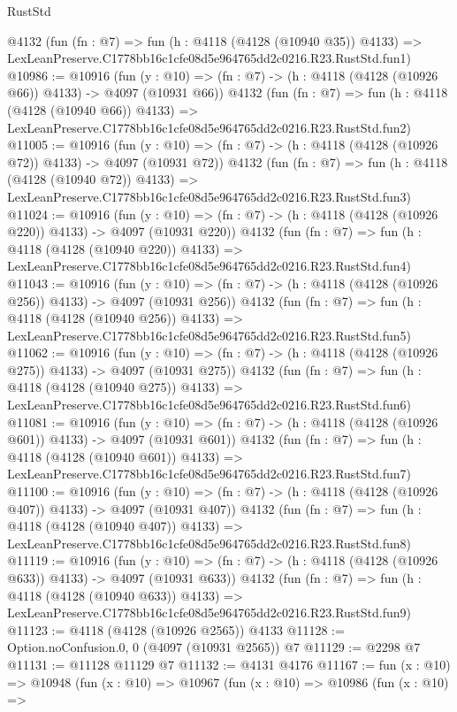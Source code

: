 \begin{lexlean}{RustStd}
\begin{coremodule}
    @4132
    (fun (fn : @7) =>
    fun (h : @4118 (@4128 (@10940 @35)) @4133) =>
    LexLeanPreserve.C1778bb16c1cfe08d5e964765dd2c0216.R23.RustStd.fun1)
@10986 := @10916
    (fun (y : @10) => (fn : @7) -> (h : @4118 (@4128 (@10926 @66)) @4133) -> @4097 (@10931 @66))
    @4132
    (fun (fn : @7) =>
    fun (h : @4118 (@4128 (@10940 @66)) @4133) =>
    LexLeanPreserve.C1778bb16c1cfe08d5e964765dd2c0216.R23.RustStd.fun2)
@11005 := @10916
    (fun (y : @10) => (fn : @7) -> (h : @4118 (@4128 (@10926 @72)) @4133) -> @4097 (@10931 @72))
    @4132
    (fun (fn : @7) =>
    fun (h : @4118 (@4128 (@10940 @72)) @4133) =>
    LexLeanPreserve.C1778bb16c1cfe08d5e964765dd2c0216.R23.RustStd.fun3)
@11024 := @10916
    (fun (y : @10) => (fn : @7) -> (h : @4118 (@4128 (@10926 @220)) @4133) -> @4097 (@10931 @220))
    @4132
    (fun (fn : @7) =>
    fun (h : @4118 (@4128 (@10940 @220)) @4133) =>
    LexLeanPreserve.C1778bb16c1cfe08d5e964765dd2c0216.R23.RustStd.fun4)
@11043 := @10916
    (fun (y : @10) => (fn : @7) -> (h : @4118 (@4128 (@10926 @256)) @4133) -> @4097 (@10931 @256))
    @4132
    (fun (fn : @7) =>
    fun (h : @4118 (@4128 (@10940 @256)) @4133) =>
    LexLeanPreserve.C1778bb16c1cfe08d5e964765dd2c0216.R23.RustStd.fun5)
@11062 := @10916
    (fun (y : @10) => (fn : @7) -> (h : @4118 (@4128 (@10926 @275)) @4133) -> @4097 (@10931 @275))
    @4132
    (fun (fn : @7) =>
    fun (h : @4118 (@4128 (@10940 @275)) @4133) =>
    LexLeanPreserve.C1778bb16c1cfe08d5e964765dd2c0216.R23.RustStd.fun6)
@11081 := @10916
    (fun (y : @10) => (fn : @7) -> (h : @4118 (@4128 (@10926 @601)) @4133) -> @4097 (@10931 @601))
    @4132
    (fun (fn : @7) =>
    fun (h : @4118 (@4128 (@10940 @601)) @4133) =>
    LexLeanPreserve.C1778bb16c1cfe08d5e964765dd2c0216.R23.RustStd.fun7)
@11100 := @10916
    (fun (y : @10) => (fn : @7) -> (h : @4118 (@4128 (@10926 @407)) @4133) -> @4097 (@10931 @407))
    @4132
    (fun (fn : @7) =>
    fun (h : @4118 (@4128 (@10940 @407)) @4133) =>
    LexLeanPreserve.C1778bb16c1cfe08d5e964765dd2c0216.R23.RustStd.fun8)
@11119 := @10916
    (fun (y : @10) => (fn : @7) -> (h : @4118 (@4128 (@10926 @633)) @4133) -> @4097 (@10931 @633))
    @4132
    (fun (fn : @7) =>
    fun (h : @4118 (@4128 (@10940 @633)) @4133) =>
    LexLeanPreserve.C1778bb16c1cfe08d5e964765dd2c0216.R23.RustStd.fun9)
@11123 := @4118 (@4128 (@10926 @2565)) @4133
@11128 := Option.noConfusion.{0, 0} (@4097 (@10931 @2565)) @7
@11129 := @2298 @7
@11131 := @11128 @11129 @7
@11132 := @4131 @4176
@11167 := fun (x : @10) =>
  @10948
    (fun (x : @10) =>
    @10967
      (fun (x : @10) =>
      @10986
        (fun (x : @10) =>

\end{coremodule}
\end{lexlean}
